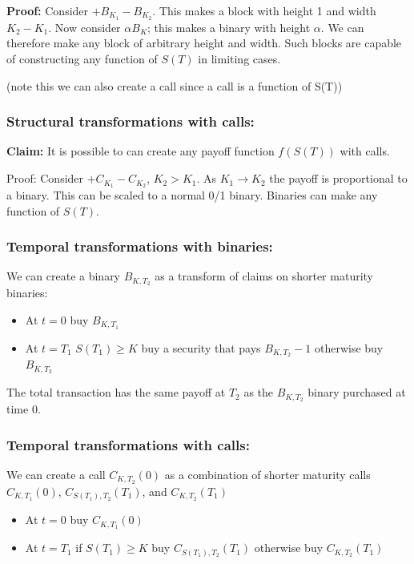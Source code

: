 \documentclass{tran-l}
\theoremstyle{definition}
\theoremstyle{remark}
\numberwithin{equation}{subsection}
\begin{document}
\textbf{Proof:} Consider $+B_{K_1} - B_{K_2}$. This makes a block with height 1 and width $K_2-K_1$. Now consider $\alpha B_K$; this makes a binary with height $\alpha$. We can therefore make any block of arbitrary height and width.  Such blocks are capable of constructing any function of $S(T)$ in limiting cases.

(note this we can also create a call since a call is a function of S(T))

\subsubsection*{Structural transformations with calls:}

\textbf{Claim:} It is possible to can create any payoff function $f(S(T))$ with calls.

Proof: Consider $+C_{K_1}-C_{K_2}$,  $K_2>K_1$. As $K_1 \rightarrow K_2$ the payoff is proportional to a binary. This can be scaled to a normal 0/1 binary. Binaries can make any function of $S(T)$.

\subsubsection{Temporal transformations with binaries:}

We can create a binary $B_{K,T_2}$ as a transform of claims on shorter maturity binaries:

\begin{itemize}
\item At $t=0$ buy $B_{K,T_1}$ 
\item At $t=T_1$ $S(T_1)\geq K$ buy a security that pays $B_{K,T_2} -1$ otherwise buy $B_{K,T_2}$
\end{itemize}

The total transaction has the same payoff at $T_2$ as the $B_{K,T_2}$ binary purchased at time 0.

\subsubsection*{Temporal transformations with calls:}

We can create a call $C_{K,T_2}(0)$ as a combination of shorter maturity calls $C_{K,T_1}(0)$, $C_{S(T_1),T_2}(T_1)$, and $C_{K,T_2}(T_1)$

\begin{itemize}
\item At $t=0$ buy $C_{K,T_1}(0)$
\item At $t=T_1$ if $S(T_1)\geq K$  buy $C_{S(T_1),T_2}(T_1)$ otherwise buy $C_{K,T_2}(T_1)$
\end{itemize}
\end{document}
